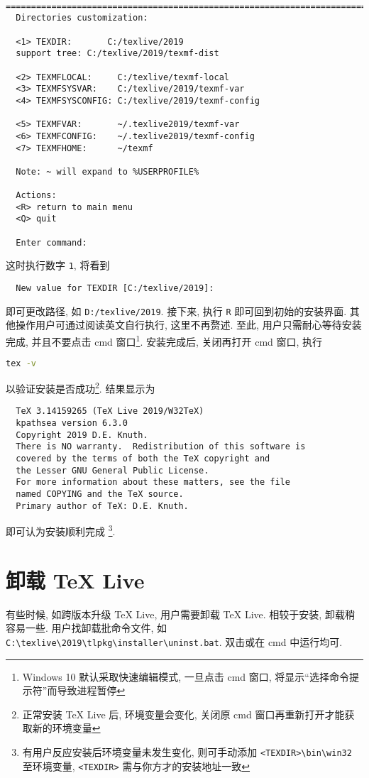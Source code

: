 \documentclass{ctexrep}
\begin{document}
\begin{lstlisting}
  ==============================================================================
  Directories customization:
  
  <1> TEXDIR:       C:/texlive/2019
  support tree: C:/texlive/2019/texmf-dist
  
  <2> TEXMFLOCAL:     C:/texlive/texmf-local
  <3> TEXMFSYSVAR:    C:/texlive/2019/texmf-var
  <4> TEXMFSYSCONFIG: C:/texlive/2019/texmf-config
  
  <5> TEXMFVAR:       ~/.texlive2019/texmf-var
  <6> TEXMFCONFIG:    ~/.texlive2019/texmf-config
  <7> TEXMFHOME:      ~/texmf
  
  Note: ~ will expand to %USERPROFILE%
  
  Actions:
  <R> return to main menu
  <Q> quit
  
  Enter command:
\end{lstlisting}
这时执行数字 \texttt{1}, 将看到
\begin{lstlisting}
  New value for TEXDIR [C:/texlive/2019]:
\end{lstlisting}
即可更改路径, 如 \texttt{D:/texlive/2019}. 
接下来, 执行 \texttt{R} 即可回到初始的安装界面. 
其他操作用户可通过阅读英文自行执行, 这里不再赘述. 
至此, 用户只需耐心等待安装完成, 并且不要点击 \textsf{cmd} 窗口\footnote{Windows 10 默认采取快速编辑模式, 一旦点击 \textsf{cmd} 窗口, 将显示``选择命令提示符''而导致进程暂停}. 
安装完成后, 关闭再打开 \textsf{cmd} 窗口, 执行
\begin{lstlisting}[language = bash]
  tex -v
\end{lstlisting}
以验证安装是否成功\footnote{正常安装 \TeX{} Live 后, 环境变量会变化, 关闭原 \textsf{cmd} 窗口再重新打开才能获取新的环境变量}. 
结果显示为
\begin{lstlisting}
  TeX 3.14159265 (TeX Live 2019/W32TeX)
  kpathsea version 6.3.0
  Copyright 2019 D.E. Knuth.
  There is NO warranty.  Redistribution of this software is
  covered by the terms of both the TeX copyright and
  the Lesser GNU General Public License.
  For more information about these matters, see the file
  named COPYING and the TeX source.
  Primary author of TeX: D.E. Knuth.
\end{lstlisting}
即可认为安装顺利完成 \footnote{有用户反应安装后环境变量未发生变化, 则可手动添加 \texttt{<TEXDIR>\textbackslash bin\textbackslash win32} 至环境变量, \texttt{<TEXDIR>} 需与你方才的安装地址一致}. 

\section{卸载 \TeX{} Live}
有些时候, 如跨版本升级 \TeX{} Live,  用户需要卸载 \TeX{} Live. 
相较于安装, 卸载稍容易一些. 
用户找卸载批命令文件, 如 \texttt{C:\textbackslash texlive\textbackslash 2019\textbackslash tlpkg\textbackslash installer\textbackslash uninst.bat}. 
双击或在 \textsf{cmd} 中运行均可. 
\end{document}
